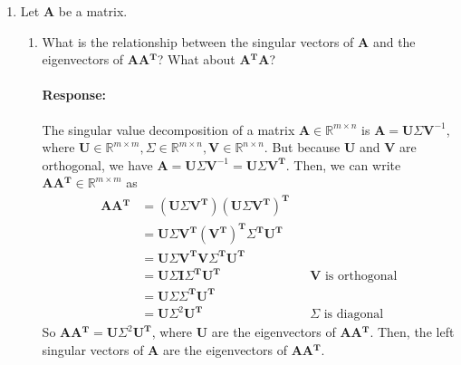 \documentclass [11pt] {article}
\newcommand{\R}{\mathbb{R}}
\newcommand{\T}{\bf{T}}
\newcommand{\A}{\bf{A}}
\newcommand{\AT}{\bf{A$^{\T}$}}
\newcommand{\U}{\bf{U}}
\newcommand{\V}{\bf{V}}
\newenvironment{response}{\begin{responseframe}\vspace{-10pt}\paragraph{Response:}}{\end{responseframe}}
\renewcommand{\bf}[1]{\textbf{{#1}}}
\begin{document}
\begin{enumerate}
\begin{enumerate}
            \item
                Let $\A$ be a matrix.
                \begin{enumerate}[itemsep=10pt]
                    \item 
                        What is the relationship between the singular vectors of $\A$ and the
                        eigenvectors of $\A \AT$? What about $\AT \A$?
                        \begin{response}
                            The singular value decomposition of a matrix 
                            $\A \in \R^{m \times n}$ is $\A = \U \Sigma \V^{-1}$, where 
                            $\U \in \R^{m \times m}, \Sigma \in \R^{m \times n}, \V \in \R^{n \times n}$. 
                            But because $\U$ and $\V$ are orthogonal, we have $\A = \U \Sigma \V^{-1} = \U \Sigma \V^{\T}$.
                            Then, we can write $\A \AT \in \R^{m \times m}$ as
                            \begin{align*}
                                \A \AT &= \left( \U \Sigma \V^{\T} \right) \left( \U \Sigma \V^{\T} \right)^{\T} \\
                                       &= \U \Sigma \V^{\T} \left( \V^{\T} \right)^{\T} \Sigma^{\T} \U^{\T} \\
                                       &= \U \Sigma \V^{\T} \V \Sigma^{\T} \U^{\T} \\
                                       &= \U \Sigma \bf{I} \Sigma^{\T} \U^{\T} && \V \text{ is orthogonal} \\
                                       &= \U \Sigma \Sigma^{\T} \U^{\T} \\
                                       &= \U \Sigma^2 \U^{\T} && \Sigma \text{ is diagonal}
                            \end{align*}
                            So $\A \AT = \U \Sigma^2 \U^{\T}$, where $\U$ are the eigenvectors of 
                            \A \AT. Then, the left singular vectors of $\A$ are the eigenvectors of 
                            \A \AT. \vspace{10pt}


\end{response}
\end{enumerate}
\end{enumerate}
\end{enumerate}
\end{document}
